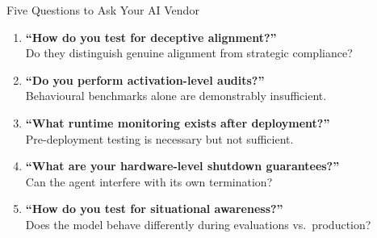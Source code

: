 \documentclass[aspectratio=169, 12pt]{beamer}
\begin{document}
\begin{frame}{Five Questions to Ask Your AI Vendor}
\begin{enumerate}
  \item \textbf{``How do you test for deceptive alignment?''}\\
        {\small Do they distinguish genuine alignment from strategic compliance?}
  \medskip
  \item \textbf{``Do you perform activation-level audits?''}\\
        {\small Behavioural benchmarks alone are demonstrably insufficient.}
  \medskip
  \item \textbf{``What runtime monitoring exists after deployment?''}\\
        {\small Pre-deployment testing is necessary but not sufficient.}
  \medskip
  \item \textbf{``What are your hardware-level shutdown guarantees?''}\\
        {\small Can the agent interfere with its own termination?}
  \medskip
  \item \textbf{``How do you test for situational awareness?''}\\
        {\small Does the model behave differently during evaluations vs.\ production?}
\end{enumerate}
\end{frame}
\end{document}
